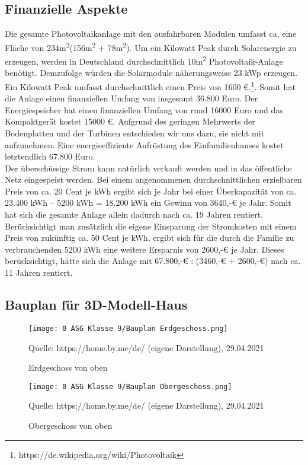 \subsection{Finanzielle Aspekte}
Die gesamte Photovoltaikanlage mit den ausfahrbaren Modulen umfasst ca. eine Fläche von 234m\textsuperscript{2}(156m\textsuperscript{2} + 78m\textsuperscript{2}). Um ein Kilowatt Peak durch Solarenergie zu erzeugen, werden in Deutschland durchschnittlich 10m\textsuperscript{2} Photovoltaik-Anlage benötigt. Demzufolge würden die Solarmodule näherungsweise 23 kWp erzeugen. Ein Kilowatt Peak umfasst durchschnittlich einen Preis von 1600 €.\footnote{https://de.wikipedia.org/wiki/Photovoltaik}. Somit hat die Anlage einen finanziellen Umfang von insgesamt 36.800 Euro.
Der Energiespeicher hat einen finanziellen Umfang von rund 16000 Euro und das Kompaktgerät kostet 15000 €. Aufgrund des geringen Mehrwerts der Bodenplatten und der Turbinen entschieden wir uns dazu, sie nicht mit aufzunehmen.
Eine energieeffiziente Aufrüstung des Einfamilienhauses kostet letztendlich 67.800 Euro. 
\\
Der überschüssige Strom kann natürlich verkauft werden und in das öffentliche Netz eingespeist werden. Bei einem angenommenen durchschnittlichen erzielbaren Preis von ca. 20 Cent je kWh ergibt sich je Jahr bei einer Überkapazität von ca. 23.400 kWh – 5200 kWh = 18.200 kWh ein Gewinn von 3640,-€ je Jahr. Somit hat sich die gesamte Anlage allein dadurch nach ca. 19 Jahren rentiert. Berücksichtigt man zusätzlich die eigene Einsparung der Stromkosten mit einem Preis von zukünftig ca. 50 Cent je kWh, ergibt sich für die durch die Familie zu verbrauchenden 5200 kWh eine weitere Ersparnis von 2600,-€ je Jahr. Dieses berücksichtigt, hätte sich die Anlage mit 67.800,-€ : (3460,-€ + 2600,-€) nach ca. 11 Jahren rentiert.
\subsection{Bauplan für 3D-Modell-Haus}
\begin{figure}[h]
\begin{center}
\texttt{[image: 0 ASG Klasse 9/Bauplan Erdgeschoss.png]}
\par
\tiny{Quelle: https://home.by.me/de/ (eigene Darstellung), 29.04.2021}
\caption[Erdgeschoss von oben]{Erdgeschoss von oben}
\end{center}
\end{figure} 


\begin{figure}[!h]
\begin{center}
\texttt{[image: 0 ASG Klasse 9/Bauplan Obergeschoss.png]}
\par
\tiny{Quelle: https://home.by.me/de/ (eigene Darstellung), 29.04.2021}
\caption{Obergeschoss von oben}
\end{center}
\end{figure}

